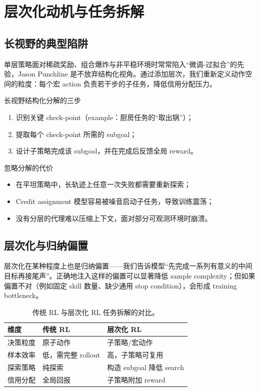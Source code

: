 \documentclass[a4paper]{article}
\begin{document}
\section{层次化动机与任务拆解}

\subsection{长视野的典型陷阱}

单层策略面对稀疏奖励、组合爆炸与非平稳环境时常常陷入“微调-过拟合”的先验，Jason Punchline 是不放弃结构化视角。通过添加层次，我们重新定义动作空间的粒度：每个宏 action 负责若干步的子任务，降低信用分配压力。

\begin{knowledgebox}{长视野结构化分解的三步}
\begin{enumerate}
    \item 识别关键 check-point（example：厨房任务的“取出锅”）；
    \item 提取每个 check-point 所需的 subgoal；
    \item 设计子策略完成该 subgoal，并在完成后反馈全局 reward。
\end{enumerate}
\end{knowledgebox}

\begin{warningbox}{忽略分解的代价}
\begin{itemize}
    \item 在平坦策略中，长轨迹上任意一次失败都需要重新探索；
    \item Credit assignment 模型容易被噪音启动子任务，导致训练震荡；
    \item 没有分层的代理难以压缩上下文，面对部分可观测环境时崩溃。
\end{itemize}
\end{warningbox}

\subsection{层次化与归纳偏置}

层次化在某种程度上也是归纳偏置——我们告诉模型“先完成一系列有意义的中间目标再接尾声”。正确地注入这样的偏置可以显著降低 sample complexity；但如果偏置不对（例如固定 skill 数量、缺少通用 stop condition），会形成 training bottleneck。

\begin{table}[H]
\centering
\begin{tabular}{p{4cm}p{5cm}p{3cm}}
\toprule
维度 & 传统 RL & 层次化 RL \\
\midrule
决策粒度 & 原子动作 & 子策略/宏动作 \\
样本效率 & 低，需完整 rollout & 高，子策略可复用 \\
探索策略 & 纯探索 & 构造 subgoal 降低 search \\
信用分配 & 全局回报 & 子策略附加 reward \\
\bottomrule
\end{tabular}
\caption{传统 RL 与层次化 RL 任务拆解的对比。}
\end{table}
\end{document}
